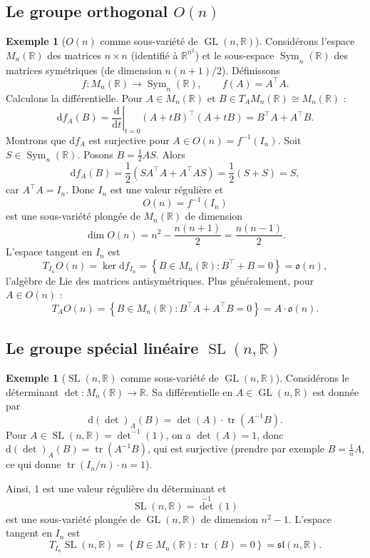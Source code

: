 \documentclass[12pt,a4paper,openany]{book}
\theoremstyle{definition}
\newtheorem{exemple}[definition]{Exemple}
\theoremstyle{plain}
\theoremstyle{remark}
\newcommand{\R}{\mathbb{R}}
\DeclareMathOperator{\GL}{GL}
\DeclareMathOperator{\SL}{SL}
\newcommand{\dd}{\mathrm{d}}
\newcommand{\set}[1]{\left\{#1\right\}}
\begin{document}
\subsection{Le groupe orthogonal $O(n)$}\label{subsec:On}

\begin{exemple}[$O(n)$ comme sous-variété de $\GL(n, \R)$]\label{ex:On-preimage}
Considérons l'espace $M_n(\R)$ des matrices $n \times n$ (identifié à $\R^{n^2}$)
et le sous-espace $\operatorname{Sym}_n(\R)$ des matrices
symétriques (de dimension $n(n+1)/2$). Définissons
\[
  f : M_n(\R) \longrightarrow \operatorname{Sym}_n(\R), \qquad f(A) = A^\top A.
\]
Calculons la différentielle. Pour $A \in M_n(\R)$ et $B \in T_A M_n(\R) \cong M_n(\R)$ :
\[
  \dd f_A(B) = \left.\frac{\dd}{\dd t}\right|_{t=0} (A + tB)^\top(A + tB)
  = B^\top A + A^\top B.
\]
Montrons que $\dd f_A$ est surjective pour $A \in O(n) = f^{-1}(I_n)$.
Soit $S \in \operatorname{Sym}_n(\R)$. Posons $B = \frac{1}{2}AS$. Alors
\[
  \dd f_A(B) = \frac{1}{2}(S A^\top A + A^\top A S) = \frac{1}{2}(S + S) = S,
\]
car $A^\top A = I_n$. Donc $I_n$ est une valeur régulière et
\[
  O(n) = f^{-1}(I_n)
\]
est une sous-variété plongée de $M_n(\R)$ de dimension
\[
  \dim O(n) = n^2 - \frac{n(n+1)}{2} = \frac{n(n-1)}{2}.
\]
L'espace tangent en $I_n$ est
\[
  T_{I_n}O(n) = \ker \dd f_{I_n} = \set{B \in M_n(\R) : B^\top + B = 0}
  = \mathfrak{o}(n),
\]
l'algèbre de Lie des matrices antisymétriques.
Plus généralement, pour $A \in O(n)$ :
\[
  T_A O(n) = \set{B \in M_n(\R) : B^\top A + A^\top B = 0} = A \cdot \mathfrak{o}(n).
\]
\end{exemple}

\subsection{Le groupe spécial linéaire $\SL(n, \R)$}\label{subsec:SLn}

\begin{exemple}[$\SL(n, \R)$ comme sous-variété de $\GL(n, \R)$]\label{ex:SLn-preimage}
\index{SL(n,R)@$\SL(n,\R)$!comme sous-variété}
Considérons le déterminant $\det : M_n(\R) \to \R$. Sa différentielle en
$A \in \GL(n, \R)$ est donnée par
\[
  \dd(\det)_A(B) = \det(A) \cdot \operatorname{tr}(A^{-1}B).
\]
Pour $A \in \SL(n, \R) = \det^{-1}(1)$, on a $\det(A) = 1$, donc
$\dd(\det)_A(B) = \operatorname{tr}(A^{-1}B)$, qui est surjective
(prendre par exemple $B = \frac{1}{n}A$, ce qui donne $\operatorname{tr}(I_n/n) \cdot n = 1$).

Ainsi, $1$ est une valeur régulière du déterminant et
\[
  \SL(n, \R) = \det^{-1}(1)
\]
est une sous-variété plongée de $\GL(n, \R)$ de dimension $n^2 - 1$.
L'espace tangent en $I_n$ est
\[
  T_{I_n}\SL(n, \R) = \set{B \in M_n(\R) : \operatorname{tr}(B) = 0} = \mathfrak{sl}(n, \R).
\]
\end{exemple}
\end{document}
